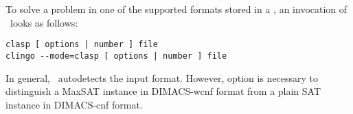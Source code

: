 To solve a problem in one of the supported formats stored in a ,
an invocation of \clasp\ looks as follows:%
\begin{lstlisting}[numbers=none]
clasp [ options | number ] file
clingo --mode=clasp [ options | number ] file
\end{lstlisting}
In general, \clasp\ autodetects the input format. However,
option  is necessary to distinguish a
MaxSAT instance in DIMACS-wcnf format from a plain SAT instance
in  DIMACS-cnf format.

